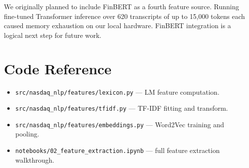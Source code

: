 \documentclass[12pt,a4paper]{article}
\begin{document}
We originally planned to include FinBERT as a fourth feature source.
Running fine-tuned Transformer inference over 620 transcripts of up to 15,000
tokens each caused memory exhaustion on our local hardware.
FinBERT integration is a logical next step for future work.

\section{Code Reference}

\begin{itemize}
  \item \texttt{src/nasdaq\_nlp/features/lexicon.py} --- LM feature computation.
  \item \texttt{src/nasdaq\_nlp/features/tfidf.py} --- TF-IDF fitting and transform.
  \item \texttt{src/nasdaq\_nlp/features/embeddings.py} --- Word2Vec training and pooling.
  \item \texttt{notebooks/02\_feature\_extraction.ipynb} --- full feature extraction walkthrough.
\end{itemize}
\end{document}
